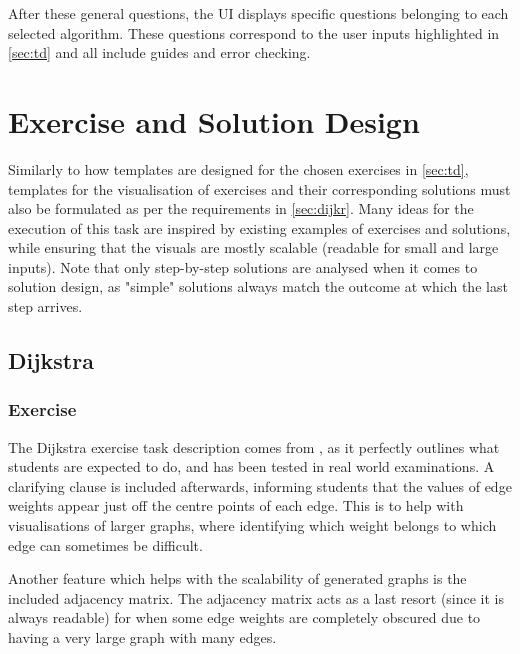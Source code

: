 \documentclass{l4proj}
\begin{document}
After these general questions, the UI displays specific questions belonging to each selected algorithm. These questions correspond to the user inputs highlighted in \autoref{sec:td} and all include guides and error checking.

\section{Exercise and Solution Design}
\label{sec:exerciseDesign}

\cite{a}

Similarly to how templates are designed for the chosen exercises in \autoref{sec:td}, templates for the visualisation of exercises and their corresponding solutions must also be formulated as per the requirements in \autoref{sec:dijkr}. Many ideas for the execution of this task are inspired by existing examples of exercises and solutions, while ensuring that the visuals are mostly scalable (readable for small and large inputs). Note that only step-by-step solutions are analysed when it comes to solution design, as "simple" solutions always match the outcome at which the last step arrives.

\subsection{Dijkstra}
\subsubsection{Exercise}
\label{sec:dijkstraExerciseDesign}

The Dijkstra exercise task description comes from \cite{a}, as it perfectly outlines what students are expected to do, and has been tested in real world examinations. A clarifying clause is included afterwards, informing students that the values of edge weights appear just off the centre points of each edge. This is to help with visualisations of larger graphs, where identifying which weight belongs to which edge can sometimes be difficult.

Another feature which helps with the scalability of generated graphs is the included adjacency matrix. The adjacency matrix acts as a last resort (since it is always readable) for when some edge weights are completely obscured due to having a very large graph with many edges. 
\end{document}
